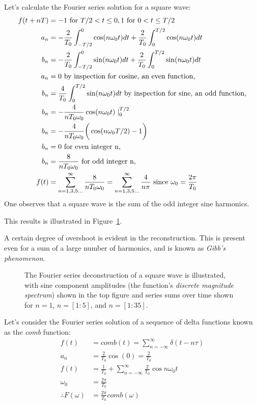 \documentclass[11pt,letterpaper,draft]{exam}
\begin{document}
Let's calculate the Fourier series solution for a square wave:
\begin{equation*}
\begin{split}
f(t+nT) & =  -1 \text{ for } T/2 < t \le 0, 1 \text{ for }0<t\le T/2\\
a_{n}&=-\frac{2}{T_{0}}\int^{0}_{-T/2}\cos(n\omega_{0}t)dt+\frac{2}{T_{0}}\int^{T/2}_{0}\cos(n\omega_{0}t)dt\\
b_{n}&=-\frac{2}{T_{0}}\int^{0}_{-T/2}\sin(n\omega_{0}t)dt+\frac{2}{T_{0}}\int^{T/2}_{0}\sin(n\omega_{0}t)dt\\
a_{n}&= 0 \text{ by inspection for cosine, an even function,}\\
b_{n}&=\frac{4}{T_{0}}\int^{T/2}_{0}\sin(n\omega_{0}t)dt\text{ by inspection for sine, an odd function,}\\
b_{n}&=-\frac{4}{nT_{0}\omega_{0}}\cos(n\omega_{0}t)\mid^{T/2}_{0}\\
b_{n}&=-\frac{4}{nT_{0}\omega_{0}}\bigg{(}\cos(n\omega_{0}T/2)-1\bigg{)}\\
b_{n}&= 0 \text{ for even integer n,}\\
b_{n}&= \frac{8}{nT_{0}\omega_{0}} \text{ for odd integer n,}\\
f(t)&=\sum^{\infty}_{n=1,3,5...}\frac{8}{nT_{0}\omega_{0}}=\sum^{\infty}_{n=1,3,5...}\frac{4}{n\pi}\text{
since }\omega_{0}=\frac{2\pi}{T_{0}}\\
\end{split}
\end{equation*}
One observes that a square wave is the sum of the odd integer sine harmonics.

This results is illustrated in Figure~\ref{fig:square_fs}.

A certain degree of overshoot is evident in the reconstruction.  This
is present even for a sum of a large number of harmonics, and is known as \textit{Gibb's phenomenon.}

\begin{figure}[ht]
\centering
\epsfxsize=6.0in
\caption{The Fourier series deconstruction of a square wave is illustrated, with
sine component amplitudes (the function's \textit{discrete magnitude
spectrum}) shown in the top figure and series sums over
time shown for $n = 1$, $n = [1:5]$, and $n=[1:35]$.}  
\label{fig:square_fs}
\end{figure}

Let's consider the Fourier series solution of a sequence of delta
functions known as the \textit{comb} function:
\begin{equation*}
\begin{split}
f(t) & = comb(t) = \sum^{\infty}_{n=-\infty}\delta(t-n\tau)\\
a_{n}&=\frac{2}{T_{0}}\cos(0)=\frac{2}{T_{0}}\\
f(t)&=\frac{1}{T_{0}}+\sum^{\infty}_{n=-\infty}\frac{2}{T_{0}}\cos
n\omega_{0}t\\
\omega_{0}&=\frac{2\pi}{T_{0}}\\
\therefore F(\omega)& = \frac{2\pi}{T_{0}}comb(\omega)
\end{split}
\end{equation*}
\end{document}
